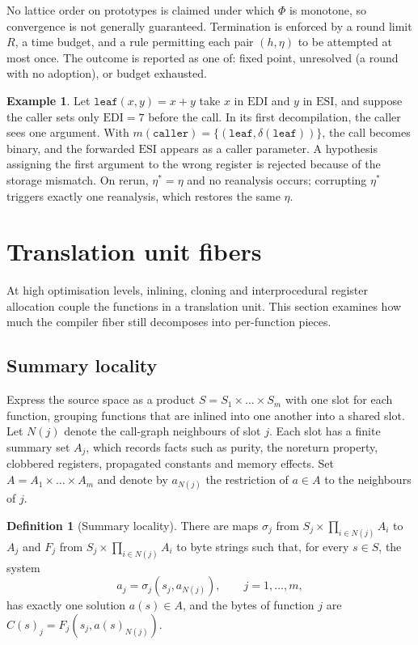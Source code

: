 \documentclass[11pt]{article}
\theoremstyle{definition}
\newtheorem{definition}[theorem]{Definition}
\newtheorem{example}[theorem]{Example}
\theoremstyle{remark}
\begin{document}
No lattice order on prototypes is claimed under which $\Phi$ is monotone, so convergence is not generally guaranteed. Termination is enforced by a round limit $R$, a time budget, and a rule permitting each pair $(h, \eta)$ to be attempted at most once. The outcome is reported as one of: fixed point, unresolved (a round with no adoption), or budget exhausted.

\begin{example}
Let $\mathtt{leaf}(x,y) = x + y$ take $x$ in $\mathrm{EDI}$ and $y$ in $\mathrm{ESI}$, and suppose the caller sets only $\mathrm{EDI} = 7$ before the call. In its first decompilation, the caller sees one argument. With $m(\mathtt{caller}) = \{(\mathtt{leaf}, \delta(\mathtt{leaf}))\}$, the call becomes binary, and the forwarded $\mathrm{ESI}$ appears as a caller parameter. A hypothesis assigning the first argument to the wrong register is rejected because of the storage mismatch. On rerun, $\eta^\ast = \eta$ and no reanalysis occurs; corrupting $\eta^\ast$ triggers exactly one reanalysis, which restores the same $\eta$.
\end{example}

\section{Translation unit fibers}\label{sec:tu}

At high optimisation levels, inlining, cloning and interprocedural register allocation couple the functions in a translation unit. This section examines how much the compiler fiber still decomposes into per-function pieces.

\subsection{Summary locality}

Express the source space as a product $S = S_1 \times \dots \times S_m$ with one slot for each function, grouping functions that are inlined into one another into a shared slot. Let $N(j)$ denote the call-graph neighbours of slot $j$. Each slot has a finite summary set $A_j$, which records facts such as purity, the noreturn property, clobbered registers, propagated constants and memory effects. Set $A = A_1 \times \dots \times A_m$ and denote by $a_{N(j)}$ the restriction of $a \in A$ to the neighbours of $j$.

\begin{definition}[Summary locality]
There are maps $\sigma_j$ from $S_j \times \prod_{i \in N(j)} A_i$ to $A_j$ and $F_j$ from $S_j \times \prod_{i \in N(j)} A_i$ to byte strings such that, for every $s \in S$, the system
\[
  a_j = \sigma_j(s_j, a_{N(j)}), \qquad j = 1, \dots, m,
\]
has exactly one solution $a(s) \in A$, and the bytes of function $j$ are $C(s)_j = F_j(s_j, a(s)_{N(j)})$.
\end{definition}
\end{document}

